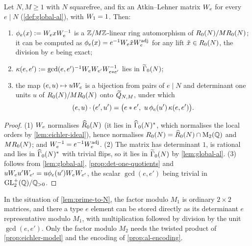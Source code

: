 \begin{proposition}\label{prop:al-encoding}
Let $N, M \geq 1$ with $N$ squarefree, and fix an Atkin--Lehner matrix
$W_{e}$ for every $e \mid N$ (\cref{def:global-al}), with
$W_{1} = 1$. Then:
\begin{enumerate}
\item $\phi_{e}(x) := W_{e}xW_{e}^{-1}$ is a
  $\mathbb{Z}/M\mathbb{Z}$-linear ring automorphism of
  $R_{0}(N)/MR_{0}(N)$; it can be computed as
  $\phi_{e}(x) = e^{-1}W_{e}\tilde{x}W_{e}^{\mathrm{adj}}$ for any
  lift $\tilde x \in R_{0}(N)$, the division by $e$ being exact;
\item $\kappa(e,e') := \gcd(e,e')^{-1}W_{e}W_{e'}
  W_{e\ast e'}^{-1}$ lies in $\GammaZero[lift]{N}$;
\item the map $(e, u) \mapsto uW_{e}$ is a bijection from pairs of
  $e \mid N$ and determinant one units $u$ of
  $R_{0}(N)/MR_{0}(N)$ onto $\widetilde{Q}_{N,M}$,
  under which
  \[
    (e,u)\cdot(e',u') = \bigl(e\ast e',\ u\,\phi_{e}(u')\,
    \kappa(e,e')\bigr).
  \]
\end{enumerate}
\end{proposition}

\begin{proof}
(1) $W_{e}$ normalises $\widehat{R}_{0}(N)$ (it lies in
$\GammaZeroStar[ad]{N}$, which normalises the local orders by
\cref{lem:eichler-ideal}), hence normalises $R_{0}(N) =
\widehat{R}_{0}(N)\cap\mathrm{M}_{2}(\mathbb{Q})$ and $MR_{0}(N)$; and
$W_{e}^{-1} = e^{-1}W_{e}^{\mathrm{adj}}$. (2) The matrix has
determinant $1$, is rational and lies in $\GammaZeroStar[ad]{N}$ with trivial
flips, so it lies in $\GammaZero[lift]{N}$ by \cref{lem:global-al}. (3)
follows from \cref{lem:global-al}, \cref{prop:det-one-quotients} and
$uW_{e}u'W_{e'} = u\phi_{e}(u')W_{e}W_{e'}$,
the scalar $\gcd(e,e')$ being trivial in $\mathrm{GL}_{2}^{+}(\mathbb{Q})/\mathbb{Q}_{>0}$.
\end{proof}

\begin{remark}[Using the split $M = M_1M_2$]
In the situation of \cref{lem:prime-to-N}, the factor modulo $M_1$ is
ordinary $2\times 2$ matrices, and there a type $e$ element can be stored
directly as its determinant $e$ representative modulo $M_1$, with
multiplication followed by division by the unit $\gcd(e,e')$. Only the
factor modulo $M_2$ needs the twisted product of
\cref{prop:eichler-model} and the encoding of \cref{prop:al-encoding}.
\end{remark}

